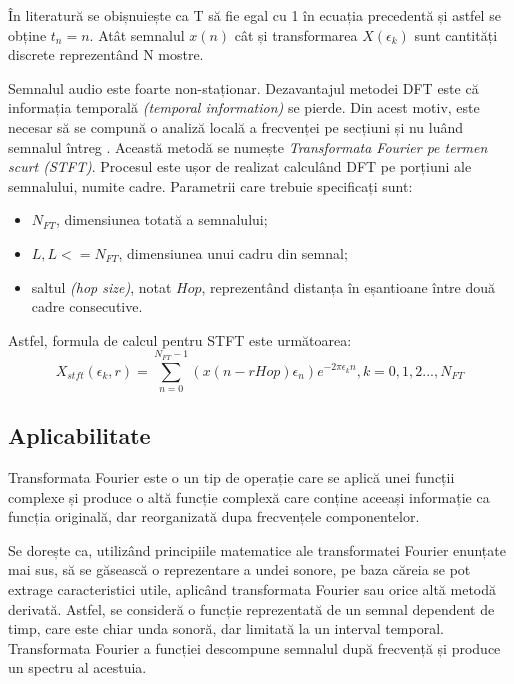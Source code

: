 \documentclass[a4paper,12pt]{report}
\begin{document}
În literatură se obișnuiește ca T să fie egal cu 1 în ecuația precedentă și astfel se 
obține $t_n = n$. Atât semnalul $x(n)$ cât și transformarea $X(\epsilon_k)$ sunt cantități
discrete reprezentând N mostre. 

Semnalul audio este foarte non-staționar. 
Dezavantajul metodei DFT este că informația temporală \emph{(temporal information)} se pierde.
Din acest motiv, este necesar să se compună o analiză locală a frecvenței pe secțiuni și nu
luând semnalul întreg \cite{Bonvini-Recognition}. 
Această metodă se numește \emph{Transformata Fourier pe termen scurt (STFT)}. 
Procesul este ușor de realizat calculând DFT pe porțiuni ale semnalului, numite
cadre. Parametrii care trebuie specificați sunt:
\begin{itemize}
    \setlength\itemsep{0.2em}
    \item $N_{FT}$, dimensiunea totată a semnalului;
    \item $L, L <= N_{FT}$, dimensiunea unui cadru din semnal;
    \item saltul \emph{(hop size)}, notat $Hop$, reprezentând distanța în eșantioane între 
două cadre consecutive.
\end{itemize}

Astfel, formula de calcul pentru STFT este următoarea:
\begin{equation*}
    X_{stft}({\epsilon}_k, r) = \sum_{n=0}^{N_{FT}-1} (x(n - rHop){\epsilon}_n) e ^ {-2 {\pi}{\epsilon}_k n } , k = 0,1,2...,N_{FT}
\end{equation*}

\subsection{Aplicabilitate}
Transformata Fourier este o un tip de operație care se aplică unei 
funcții complexe și produce o altă funcție complexă care conține aceeași informație ca funcția originală, 
dar reorganizată dupa frecvențele componentelor.

Se dorește ca, utilizând principiile matematice ale transformatei Fourier 
enunțate mai sus, să se găsească o reprezentare
a undei sonore, pe baza căreia se pot extrage caracteristici utile, aplicând transformata Fourier sau orice altă
metodă derivată.
Astfel, se consideră o funcție reprezentată de un semnal dependent
de timp, care este chiar unda sonoră, dar limitată la un interval temporal. 
Transformata Fourier a funcției descompune semnalul după frecvență și 
produce un spectru al acestuia.
\end{document}

